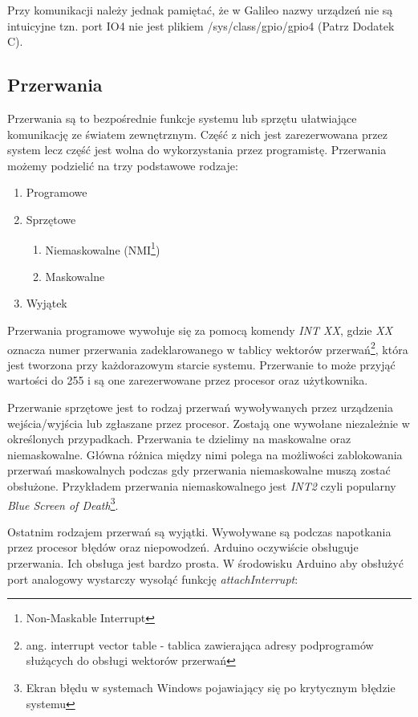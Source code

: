 \documentclass{xmgr}
\begin{document}
Przy komunikacji należy jednak pamiętać, że w Galileo nazwy urządzeń nie są intuicyjne tzn. port IO4 nie jest plikiem /sys/class/gpio/gpio4 (Patrz Dodatek C).

\subsection{Przerwania}
Przerwania są to bezpośrednie funkcje systemu lub sprzętu ułatwiające komunikację ze światem zewnętrznym. Część z nich jest zarezerwowana przez system lecz część jest wolna do wykorzystania przez programistę. Przerwania możemy podzielić na trzy podstawowe rodzaje:

\begin{enumerate}
	\item Programowe
	\item Sprzętowe
	\begin{enumerate}
		\item Niemaskowalne (NMI\footnote{Non-Maskable Interrupt})
		\item Maskowalne
	\end{enumerate}
	\item Wyjątek
\end{enumerate}

Przerwania programowe wywołuje się za pomocą komendy \emph{INT XX}, gdzie \emph{XX} oznacza numer przerwania zadeklarowanego w tablicy wektorów przerwań\footnote{ang. interrupt vector table - tablica zawierająca adresy podprogramów służących do obsługi wektorów przerwań}, która jest tworzona przy każdorazowym starcie systemu. Przerwanie to może przyjąć wartości do 255 i są one zarezerwowane przez procesor oraz użytkownika.

Przerwanie sprzętowe jest to rodzaj przerwań wywoływanych przez urządzenia wejścia/wyjścia lub zgłaszane przez procesor. Zostają one wywołane niezależnie w określonych przypadkach. Przerwania te dzielimy na maskowalne oraz niemaskowalne. Główna różnica między nimi polega na możliwości zablokowania przerwań maskowalnych podczas gdy przerwania niemaskowalne muszą zostać obsłużone. Przykładem przerwania niemaskowalnego jest \emph{INT2} czyli popularny \emph{Blue Screen of Death}\footnote{Ekran błędu w systemach Windows pojawiający się po krytycznym błędzie systemu}.

Ostatnim rodzajem przerwań są wyjątki. Wywoływane są podczas napotkania przez procesor błędów oraz niepowodzeń. Arduino oczywiście obsługuje przerwania. Ich obsługa jest bardzo prosta. W środowisku Arduino aby obsłużyć port analogowy wystarczy wysołąć funkcję \emph{attachInterrupt}:
\end{document}
